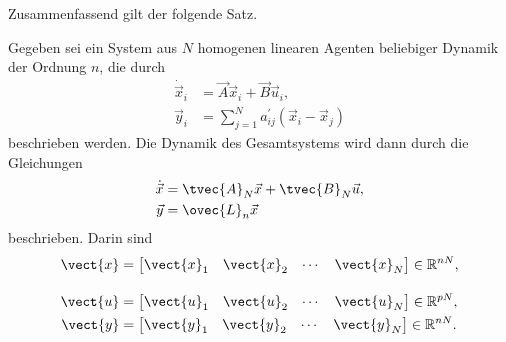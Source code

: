 Zusammenfassend gilt der folgende Satz.
\begin{satz} \label{thm:gesamtsystem}
	Gegeben sei ein System aus $N$ homogenen linearen Agenten beliebiger Dynamik der Ordnung $n$, die durch
	\begin{align*}
		\dot{\vec{x}}_i &= \vec{A}\vec{x}_i + \vec{B}\vec{u}_i,\\
		\vec{y}_i &= \sum_{j=1}^N{a_{ij}^{'}\left(\vec{x}_i-\vec{x}_j\right)}
	\end{align*}
	beschrieben werden. Die Dynamik des Gesamtsystems wird dann durch die Gleichungen
	\begin{align*}\begin{split} \label{eq:gesamtsystem}
		\dot{\vec{x}} &= \tvec{A}_N \vec{x} + \tvec{B}_N \vec{u}, \\
		\vec{y} &= \ovec{L}_n \vec{x}
	\end{split}\end{align*}
	beschrieben. Darin sind
	\begin{align}
		\vect{x} &= \begin{bmatrix}\vect{x}_1 & \vect{x}_2 & \cdots & \vect{x}_N\end{bmatrix} \in \mathbb{R}^{nN}, \notag\\[10pt]
		\vect{u} &= \begin{bmatrix}\vect{u}_1 & \vect{u}_2 & \cdots & \vect{u}_N\end{bmatrix} \in \mathbb{R}^{pN}, \\
		\vect{y} &= \begin{bmatrix}\vect{y}_1 & \vect{y}_2 & \cdots & \vect{y}_N\end{bmatrix} \in \mathbb{R}^{nN}.
	\end{align}
\end{satz}
